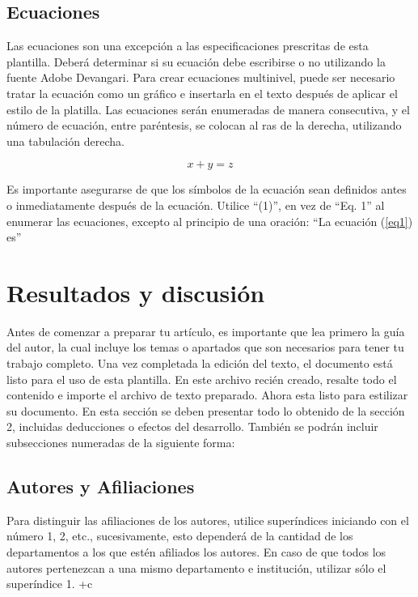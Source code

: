     \subsection{Ecuaciones}
    
    Las ecuaciones son una excepción a las especificaciones prescritas de esta plantilla. 
    Deberá determinar si su ecuación debe escribirse o no utilizando la fuente Adobe Devangari. 
    Para crear ecuaciones multinivel, puede ser necesario tratar la ecuación como un gráfico e insertarla en el texto después de aplicar el estilo de la platilla.
    Las ecuaciones serán enumeradas de manera consecutiva, y el número de ecuación, entre paréntesis, se colocan al ras de la derecha, utilizando una tabulación derecha. 
    
    \begin{equation}
        \label{eq1}
        x + y = z 
    \end{equation}
    
    Es importante asegurarse de que los símbolos de la ecuación sean definidos antes o inmediatamente después de la ecuación. Utilice “(1)”, en vez de “Eq. 1” al enumerar las ecuaciones, excepto al principio de una oración: “La ecuación (\ref{eq1}) es”
    
    
    
    \section{Resultados y discusión}
    
    Antes de comenzar a preparar tu artículo, es importante que lea primero la guía del autor, la cual incluye los temas o apartados que son necesarios para tener tu trabajo completo.
    Una vez completada la edición del texto, el documento está listo para el uso de esta plantilla. En este archivo recién creado, resalte todo el contenido e importe el archivo de texto preparado. Ahora esta listo para estilizar su documento.
    En esta sección se deben presentar todo lo obtenido de la sección 2, incluidas deducciones o efectos del desarrollo. También se podrán incluir subsecciones numeradas de la siguiente forma:
    
    \subsection{Autores y Afiliaciones}
    
    Para distinguir las afiliaciones de los autores, utilice superíndices iniciando con el número 1, 2, etc., sucesivamente, esto dependerá de la cantidad de los departamentos a los que estén afiliados los autores. En caso de que todos los autores pertenezcan a una mismo departamento e institución, utilizar sólo el superíndice 1. 
    +c
